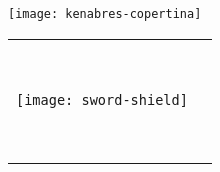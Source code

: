 \begin{titlepage}
\null\vfill
\begin{center}
\large
\sffamily

\bigskip

{\Large\spacedlowsmallcaps{\myName}} \\

\bigskip

{\huge\spacedlowsmallcaps{\myTitle} \\
}

\vspace{2cm}

\texttt{[image: kenabres-copertina]}

\bigskip
    
\vspace{7cm}

\begin{tabular} {cc}
\parbox{0.3\textwidth}{\texttt{[image: sword-shield]}}
&
\parbox{0.7\textwidth}{{\Large\spacedlowsmallcaps{\mySubTitle}} \\ 

					{\normalsize
					
					\myGroup \\
					\myUrl \\
					\myTime}}
			\end{tabular}
\end{center}
\vfill
\end{titlepage}




